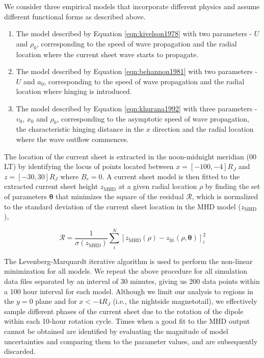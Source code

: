 We consider three empirical models that incorporate different physics and assume different functional forms as described above.
\begin{enumerate}
    \item The  model described by Equation \ref{eqn:kivelson1978} with two parameters - $U$ and $\rho_0$, corresponding to the speed of wave propagation and the radial location where the current sheet wave starts to propagate. 
    \item The  model described by Equation \ref{eqn:behannon1981} with two parameters - $U$ and $a_0$, corresponding to the speed of wave propagation and the radial location where hinging is introduced.
    \item The  model described by Equation \ref{eqn:khurana1992} with three parameters - $v_0$, $x_0$ and $\rho_0$, corresponding to the asymptotic speed of wave propagation, the characteristic hinging distance in the $x$ direction and the radial location where the wave outflow commences. 
\end{enumerate}

The location of the current sheet is extracted in the noon-midnight meridian (00 LT) by identifying the locus of points located between $x=[-100, -4] R_J$ and $z=[-30, 30] R_J$ where  $B_r=0$. A current sheet model is then fitted to the extracted current sheet height $z_\text{MHD}$ at a given radial location $\rho$ by finding the set of parameters $\boldsymbol\theta$ that minimizes the square of the residual $\mathcal{R}$, which is normalized to the standard deviation of the current sheet location in the MHD model ($z_\text{MHD}$),

\begin{equation}
    \mathcal{R} = \frac{1}{\sigma(z_\text{MHD})} \sum_i^N \left[ z_\text{MHD}(\rho) - z_\text{fit} (\rho, \boldsymbol\theta) \right]_i^2
\end{equation}

The Levenberg-Marquardt iterative algorithm \cite{Newville2018Non-LinearPython,Levenberg1944ASquares} is used to perform the non-linear minimization for all models. We repeat the above procedure for all simulation data files separated by an interval of 30 minutes, giving us 200 data points within a 100 hour interval for each model. Although we limit our analysis to regions in the $y=0$ plane and for $x < -4 R_J$ (i.e., the nightside magnetotail), we effectively sample different phases of the current sheet due to the rotation of the dipole within each 10-hour rotation cycle. Times when a good fit to the MHD output cannot be obtained are identified by evaluating the magnitude of model uncertainties and comparing them to the parameter values, and are subsequently discarded. 

